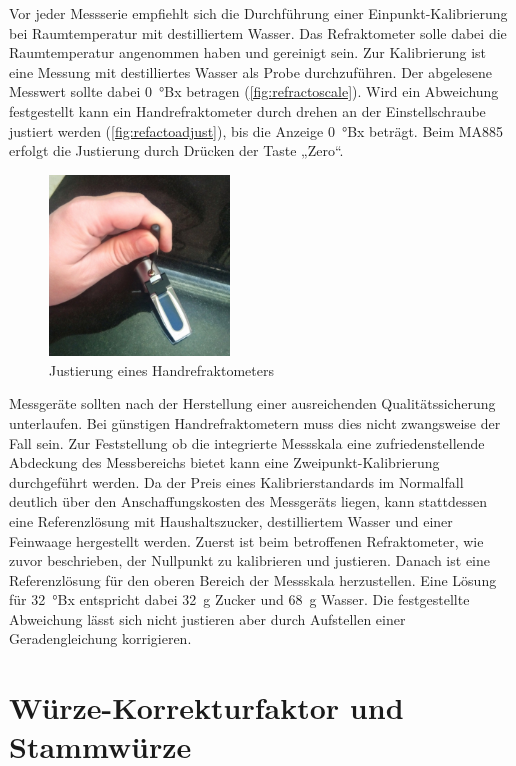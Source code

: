 \documentclass[a4paper,parskip=half]{scrartcl}
\begin{document}
Vor jeder Messserie empfiehlt sich die Durchführung einer
Einpunkt-Kalibrierung bei Raumtemperatur mit destilliertem
Wasser. Das Refraktometer solle dabei die Raumtemperatur
angenommen haben und gereinigt sein. Zur Kalibrierung ist
eine Messung mit destilliertes Wasser als Probe durchzuführen.
Der abgelesene Messwert sollte dabei 0~°Bx betragen
(\autoref{fig:refractoscale}).
Wird ein Abweichung festgestellt kann ein Handrefraktometer durch
drehen an der Einstellschraube justiert werden (\autoref{fig:refactoadjust}),
bis die Anzeige 0~°Bx beträgt. Beim MA885 erfolgt die
Justierung durch Drücken der Taste „Zero“.
\autocite{Bonham2001,Depalma2017,Terrill2013}

\begin{figure}[h]
\centering
\includegraphics[width=4.8cm]{images/adjust.jpg}
\caption{Justierung eines Handrefraktometers}
\label{fig:refactoadjust}
\end{figure}

Messgeräte sollten nach der Herstellung einer ausreichenden
Qualitätssicherung unterlaufen. Bei günstigen Handrefraktometern
muss dies nicht zwangsweise der Fall sein. Zur Feststellung
ob die integrierte Messskala eine zufriedenstellende Abdeckung
des Messbereichs bietet kann eine Zweipunkt-Kalibrierung durchgeführt
werden. Da der Preis eines Kalibrierstandards im Normalfall
deutlich über den Anschaffungskosten des Messgeräts
liegen, kann stattdessen eine Referenzlösung mit Haushaltszucker,
destilliertem Wasser und einer Feinwaage hergestellt werden. Zuerst
ist beim betroffenen Refraktometer, wie zuvor beschrieben, der
Nullpunkt zu kalibrieren und justieren. Danach ist eine Referenzlösung
für den oberen Bereich der Messskala herzustellen. Eine Lösung 
für 32~°Bx entspricht dabei 32~g Zucker und 68~g Wasser.
Die festgestellte Abweichung lässt sich nicht justieren aber
durch Aufstellen einer Geradengleichung korrigieren.
\autocite{Earl2015,Terrill2013,Troester2012}

\section*{Würze-Korrekturfaktor und Stammwürze}
\end{document}
